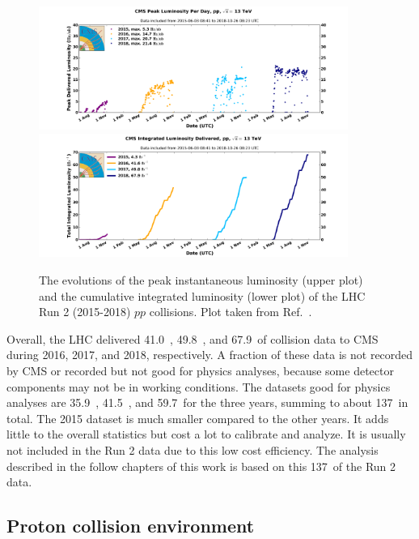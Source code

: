 \begin{figure}[!htb]
    \centering
    \captionsetup{justification=justified}
    \includegraphics[width=0.90\textwidth]{pics/LHC_CMS/peak_lumi_pp_run2.png}
    \includegraphics[width=0.90\textwidth]{pics/LHC_CMS/int_lumi_cumulative_pp_1_run2.png}
    \caption{The evolutions of the peak instantaneous luminosity (upper plot) and the cumulative integrated luminosity (lower plot)
             of the LHC Run 2 (2015-2018) $pp$ collisions.
             Plot taken from Ref.~\cite{lhc_lumi_pub}.}
    \label{fig:lhc_lumi}
\end{figure}

Overall, the LHC delivered 41.0~\invfb, 49.8~\invfb, and 67.9~\invfb of collision data to CMS during 2016, 2017, and 2018, respectively.
A fraction of these data is not recorded by CMS or recorded but not good for physics analyses, because some detector components may not be in working conditions.
The datasets good for physics analyses are 35.9~\invfb, 41.5~\invfb, and 59.7~\invfb for the three years, summing to about 137~\invfb in total.
The 2015 dataset is much smaller compared to the other years.
It adds little to the overall statistics but cost a lot to calibrate and analyze.
It is usually not included in the Run 2 data due to this low cost efficiency.
The \hmm analysis described in the follow chapters of this work is based on this 137~\invfb of the Run 2 data.


\subsection{Proton collision environment}

